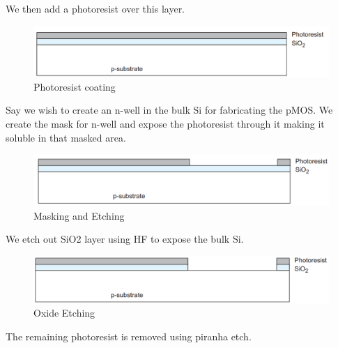 \noindent We then add a photoresist over this layer. 

\begin{figure}[htb]
\centering
\includegraphics[scale=0.3]{./fig6} %
\caption{Photoresist coating}
\label{3.6} %
\end{figure}
 
\noindent Say we wish to create an n-well in the bulk Si for fabricating the pMOS. We create the mask for n-well and expose the photoresist through it making it soluble in that masked area. 
\begin{figure}[H]
\centering
\includegraphics[scale=0.3]{./fig7} %
\caption{Masking and Etching}
\label{3.7} %
\end{figure}
 




\noindent We etch out SiO2 layer using HF to expose the bulk Si.

\begin{figure}[H]
\centering
\includegraphics[scale=0.3]{./fig8} %
\caption{Oxide Etching}
\label{3.8} %
\end{figure}
 

\noindent The remaining photoresist is removed using piranha etch.

